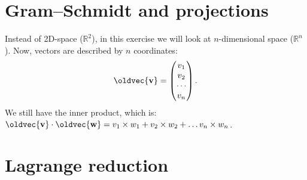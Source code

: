 \documentclass[10pt,a4paper]{article}
\renewcommand{\vec}[1]{\oldvec{\mathbf{#1}}}
\newcommand{\RR}{\mathbb{R}}
\begin{document}
\clearpage
\section{Gram--Schmidt and projections}

Instead of 2D-space (\(\RR^2\)), in this exercise we will look at \(n\)-dimensional space (\(\RR^n\)).
Now, vectors are described by \(n\) coordinates:
\[
	\vec{v} = \begin{pmatrix} v_1 \\ v_2 \\ \cdots \\ v_n \end{pmatrix}.
\]
We still have the inner product, which is:
\(\vec{v} \cdot \vec{w} = v_1 \times w_1 + v_2 \times w_2 + \ldots v_n \times w_n\).

\section{Lagrange reduction}
\end{document}
